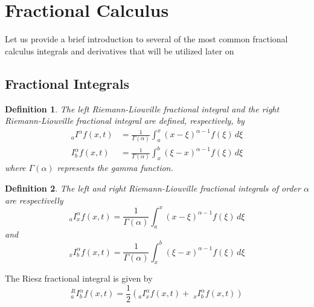 \documentclass[a4paper,12pt]{extarticle}
\newtheorem{definition}{Definition}[section]
\numberwithin{equation}{subsection}
\begin{document}
\section{Fractional Calculus}
Let us provide a brief introduction to several of the most common fractional calculus integrals and derivatives that will be utilized later on
\subsection{Fractional Integrals}
\begin{definition}
The left Riemann-Liouville fractional integral and the right Riemann-Liouville fractional integral are defined, respectively, by
\begin{equation}
\begin{aligned}
_aI^\alpha f(x,t)&=\frac{1}{\Gamma(\alpha)}\int_a^x(x-\xi)^{\alpha-1}f(\xi)\,d\xi\\
I_b^\alpha f(x,t)&=\frac{1}{\Gamma(\alpha)}\int_x^b(\xi-x)^{\alpha-1}f(\xi)\,d\xi
\end{aligned}
\end{equation}
where $\Gamma(\alpha)$ represents the gamma function.
\end{definition}
\begin{definition}
The left and right Riemann-Liouville fractional integrals of order $\alpha$ are respectivelly
\begin{equation}
_aI_x^\alpha f(x,t)=\frac{1}{\Gamma(\alpha)}\int_a^x(x-\xi)^{\alpha-1}f(\xi)\,d\xi
\end{equation}
and
\begin{equation}
_xI_b^\alpha f(x,t)=\frac{1}{\Gamma(\alpha)}\int_x^b(\xi-x)^{\alpha-1}f(\xi)\,d\xi
\end{equation}
\end{definition}
The Riesz fractional integral is given by
\begin{equation}
^R_aI_b^\alpha f(x,t)=\frac{1}{2}\left(_aI_x^\alpha f(x,t)+\; _xI_b^\alpha f(x,t)\right)
\end{equation}
\end{document}
